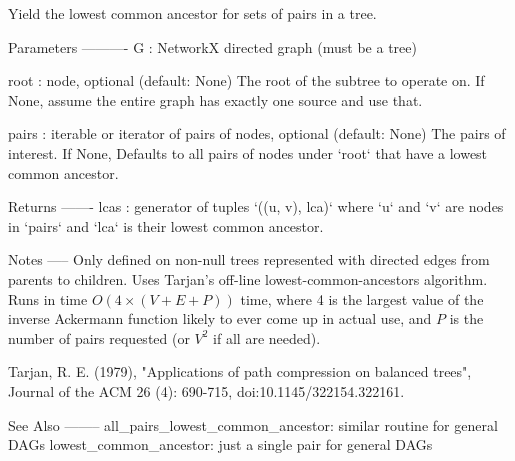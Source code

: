 \begin{DoxyVerb}Yield the lowest common ancestor for sets of pairs in a tree.

Parameters
----------
G : NetworkX directed graph (must be a tree)

root : node, optional (default: None)
    The root of the subtree to operate on.
    If None, assume the entire graph has exactly one source and use that.

pairs : iterable or iterator of pairs of nodes, optional (default: None)
    The pairs of interest. If None, Defaults to all pairs of nodes
    under `root` that have a lowest common ancestor.

Returns
-------
lcas : generator of tuples `((u, v), lca)` where `u` and `v` are nodes
    in `pairs` and `lca` is their lowest common ancestor.

Notes
-----
Only defined on non-null trees represented with directed edges from
parents to children. Uses Tarjan's off-line lowest-common-ancestors
algorithm. Runs in time $O(4 \times (V + E + P))$ time, where 4 is the largest
value of the inverse Ackermann function likely to ever come up in actual
use, and $P$ is the number of pairs requested (or $V^2$ if all are needed).

Tarjan, R. E. (1979), "Applications of path compression on balanced trees",
Journal of the ACM 26 (4): 690-715, doi:10.1145/322154.322161.

See Also
--------
all_pairs_lowest_common_ancestor: similar routine for general DAGs
lowest_common_ancestor: just a single pair for general DAGs
\end{DoxyVerb}
 